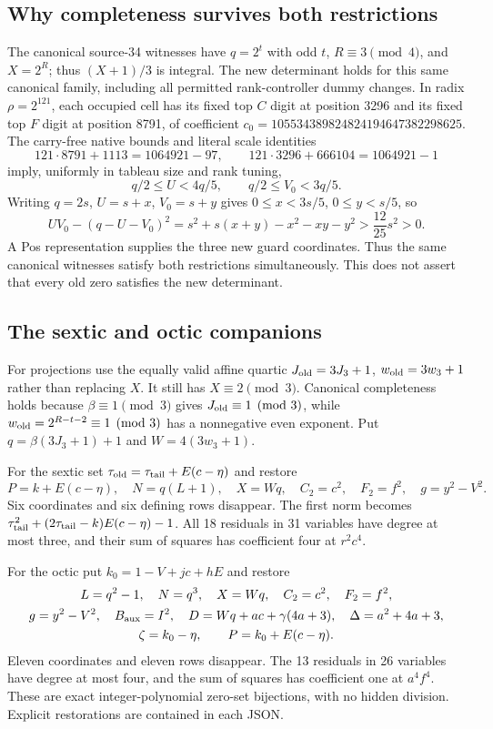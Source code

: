 \subsection{Why completeness survives both restrictions}
The canonical source-34 witnesses have $q=2^t$ with odd $t$,
$R\equiv3\pmod4$, and $X=2^R$; thus $(X+1)/3$ is integral.
The new determinant holds for this same canonical family, including all
permitted rank-controller dummy changes. In radix $\rho=2^{121}$,
each occupied cell has its fixed top $C$ digit at position 3296 and its
fixed top $F$ digit at position 8791, of coefficient
$c_0=105534389824824194647382298625$.
The carry-free native bounds and literal scale identities
\[
 121\cdot8791+1113=1064921-97,\qquad
 121\cdot3296+666104=1064921-1
\]
imply, uniformly in tableau size and rank tuning,
\[
 q/2\le U<4q/5,\qquad q/2\le V_0<3q/5.
\]
Writing $q=2s$, $U=s+x$, $V_0=s+y$ gives
$0\le x<3s/5$, $0\le y<s/5$, so
\[
 UV_0-(q-U-V_0)^2
 =s^2+s(x+y)-x^2-xy-y^2>\frac{12}{25}s^2>0.
\]
A Pos representation supplies the three new guard coordinates.
Thus the same canonical witnesses satisfy both restrictions simultaneously.
This does not assert that every old zero satisfies the new determinant.

\subsection{The sextic and octic companions}
For projections use the equally valid affine quartic
$J_{\rm old}=3J_3+1$, $w_{\rm old}=3w_3+1$ rather than replacing $X$.
It still has $X\equiv2\pmod3$.
Canonical completeness holds because $\beta\equiv1\pmod3$ gives
$J_{\rm old}\equiv1\pmod3$, while
$w_{\rm old}=2^{R-t-2}\equiv1\pmod3$ has a nonnegative even exponent.
Put $q=\beta(3J_3+1)+1$ and $W=4(3w_3+1)$.

For the sextic set $\tau_{\rm old}=\tau_{\rm tail}+E(c-\eta)$ and restore
\[
 P=k+E(c-\eta),\quad N=q(L+1),\quad X=Wq,\quad
 C_2=c^2,\quad F_2=f^2,\quad g=y^2-V^2.
\]
Six coordinates and six defining rows disappear. The first norm becomes
$\tau_{\rm tail}^2+(2\tau_{\rm tail}-k)E(c-\eta)-1$.
All 18 residuals in 31 variables have degree at most three, and their
sum of squares has coefficient four at $r^2c^4$.

For the octic put $k_0=1-V+jc+hE$ and restore
\[
\begin{gathered}
 L=q^2-1,\quad N=q^3,\quad X=Wq,\quad C_2=c^2,\quad F_2=f^2,\\
 g=y^2-V^2,\quad B_{\rm aux}=I^2,\quad
 D=Wq+ac+\gamma(4a+3),\quad\Delta=a^2+4a+3,\\
 \zeta=k_0-\eta,\qquad P=k_0+E(c-\eta).
\end{gathered}
\]
Eleven coordinates and eleven rows disappear. The 13 residuals in 26
variables have degree at most four, and the sum of squares has coefficient
one at $a^4f^4$. These are exact integer-polynomial zero-set bijections,
with no hidden division. Explicit restorations are contained in each JSON.

